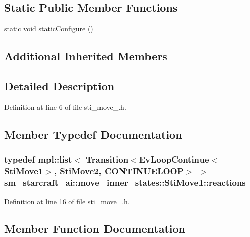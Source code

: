 \subsection*{Static Public Member Functions}
\begin{DoxyCompactItemize}
\item 
static void \hyperlink{structsm__starcraft__ai_1_1move__inner__states_1_1StiMove1_af5b082714bc05b79841e1b4b57a33c19}{static\+Configure} ()
\end{DoxyCompactItemize}
\subsection*{Additional Inherited Members}


\subsection{Detailed Description}


Definition at line 6 of file sti\+\_\+move\+\_.\+h.



\subsection{Member Typedef Documentation}
\subsubsection[{\texorpdfstring{reactions}{reactions}}]{\setlength{\rightskip}{0pt plus 5cm}typedef mpl\+::list$<$ Transition$<$Ev\+Loop\+Continue$<${\bf Sti\+Move1}$>$, {\bf Sti\+Move2}, C\+O\+N\+T\+I\+N\+U\+E\+L\+O\+OP$>$ $>$ {\bf sm\+\_\+starcraft\+\_\+ai\+::move\+\_\+inner\+\_\+states\+::\+Sti\+Move1\+::reactions}}\hypertarget{structsm__starcraft__ai_1_1move__inner__states_1_1StiMove1_a6229ca10912d8860ea23e26acc27b3df}{}\label{structsm__starcraft__ai_1_1move__inner__states_1_1StiMove1_a6229ca10912d8860ea23e26acc27b3df}


Definition at line 16 of file sti\+\_\+move\+\_.\+h.



\subsection{Member Function Documentation}
